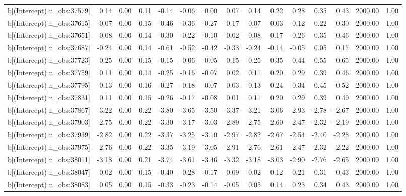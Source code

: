 \begin{table}[ht]
\begin{tabular}{rrrrrrrrrrrrrrr}
  b[(Intercept) n\_obs:37579] & 0.14 & 0.00 & 0.11 & -0.14 & -0.06 & 0.00 & 0.07 & 0.14 & 0.22 & 0.28 & 0.35 & 0.43 & 2000.00 & 1.00 \\ 
  b[(Intercept) n\_obs:37615] & -0.07 & 0.00 & 0.15 & -0.46 & -0.36 & -0.27 & -0.17 & -0.07 & 0.03 & 0.12 & 0.22 & 0.30 & 2000.00 & 1.00 \\ 
  b[(Intercept) n\_obs:37651] & 0.08 & 0.00 & 0.14 & -0.30 & -0.22 & -0.10 & -0.02 & 0.08 & 0.17 & 0.26 & 0.35 & 0.46 & 2000.00 & 1.00 \\ 
  b[(Intercept) n\_obs:37687] & -0.24 & 0.00 & 0.14 & -0.61 & -0.52 & -0.42 & -0.33 & -0.24 & -0.14 & -0.05 & 0.05 & 0.17 & 2000.00 & 1.00 \\ 
  b[(Intercept) n\_obs:37723] & 0.25 & 0.00 & 0.15 & -0.15 & -0.06 & 0.05 & 0.15 & 0.25 & 0.35 & 0.44 & 0.55 & 0.65 & 2000.00 & 1.00 \\ 
  b[(Intercept) n\_obs:37759] & 0.11 & 0.00 & 0.14 & -0.25 & -0.16 & -0.07 & 0.02 & 0.11 & 0.20 & 0.29 & 0.39 & 0.46 & 2000.00 & 1.00 \\ 
  b[(Intercept) n\_obs:37795] & 0.13 & 0.00 & 0.16 & -0.27 & -0.18 & -0.07 & 0.03 & 0.13 & 0.24 & 0.34 & 0.45 & 0.52 & 2000.00 & 1.00 \\ 
  b[(Intercept) n\_obs:37831] & 0.11 & 0.00 & 0.15 & -0.26 & -0.17 & -0.08 & 0.01 & 0.11 & 0.20 & 0.29 & 0.39 & 0.49 & 2000.00 & 1.00 \\ 
  b[(Intercept) n\_obs:37867] & -3.22 & 0.00 & 0.22 & -3.80 & -3.65 & -3.50 & -3.37 & -3.21 & -3.06 & -2.93 & -2.78 & -2.67 & 2000.00 & 1.00 \\ 
  b[(Intercept) n\_obs:37903] & -2.75 & 0.00 & 0.22 & -3.30 & -3.17 & -3.03 & -2.89 & -2.75 & -2.60 & -2.47 & -2.32 & -2.19 & 2000.00 & 1.00 \\ 
  b[(Intercept) n\_obs:37939] & -2.82 & 0.00 & 0.22 & -3.37 & -3.25 & -3.10 & -2.97 & -2.82 & -2.67 & -2.54 & -2.40 & -2.28 & 2000.00 & 1.00 \\ 
  b[(Intercept) n\_obs:37975] & -2.76 & 0.00 & 0.22 & -3.35 & -3.19 & -3.05 & -2.91 & -2.76 & -2.61 & -2.47 & -2.32 & -2.22 & 2000.00 & 1.00 \\ 
  b[(Intercept) n\_obs:38011] & -3.18 & 0.00 & 0.21 & -3.74 & -3.61 & -3.46 & -3.32 & -3.18 & -3.03 & -2.90 & -2.76 & -2.65 & 2000.00 & 1.00 \\ 
  b[(Intercept) n\_obs:38047] & 0.02 & 0.00 & 0.15 & -0.40 & -0.28 & -0.17 & -0.09 & 0.02 & 0.12 & 0.21 & 0.31 & 0.43 & 2000.00 & 1.00 \\ 
  b[(Intercept) n\_obs:38083] & 0.05 & 0.00 & 0.15 & -0.33 & -0.23 & -0.14 & -0.05 & 0.05 & 0.14 & 0.23 & 0.34 & 0.43 & 2000.00 & 1.00 \\ 

\end{tabular}
\end{table}
